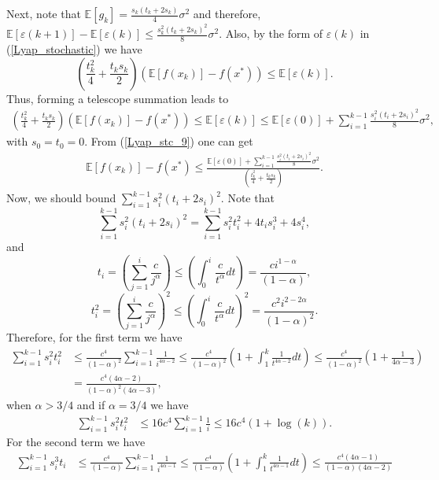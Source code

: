 \documentclass{article}
\theoremstyle{plain}
\theoremstyle{definition}
\theoremstyle{remark}
\begin{document}
        Next, note that $\mathbb E[g_k]= \frac{s_k(t_k+2s_k)}{4}\sigma^2$ and therefore, $\mathbb E [\varepsilon(k+1)]-\mathbb E[ \varepsilon (k)]\leq \frac{s_k^2(t_k+2s_k)^2}{8}\sigma^2$. Also, by the form of $\varepsilon(k)$ in (\ref{Lyap_stochastic}) we have $$(\frac{t_k^2}{4}+\frac{t_{k}s_k}{2})(\mathbb E[f(x_k)]-f(x^*))\leq \mathbb E[\varepsilon(k)].$$
        Thus, forming a telescope summation leads to
        \begin{align}\label{Lyap_stc_9}
            (\frac{t_k^2}{4}+\frac{t_{k}s_k}{2})(\mathbb E[f(x_k)]-f(x^*))\leq\mathbb E[\varepsilon(k)]\leq \mathbb E[\varepsilon(0)] + \sum_{i=1}^{k-1} \frac{s_i^2(t_i+2s_i)^2}{8}\sigma^2,
        \end{align}
        with $s_0=t_0=0$. From (\ref{Lyap_stc_9}) one can get
        \begin{align}\label{Lyap_stc_10}
            \mathbb E[f(x_k)]-f(x^*) \leq \frac{\mathbb E[\varepsilon(0)] + \sum_{i=1}^{k-1} \frac{s_i^2(t_i+2s_i)^2}{8}\sigma^2}{(\frac{t_k^2}{4}+\frac{t_{k}s_k}{2})}.
        \end{align}
        Now, we should bound $\sum_{i=1}^{k-1} s_i^2(t_i+2s_i)^2$. Note that 
        $$\sum_{i=1}^{k-1} s_i^2(t_i+2s_i)^2=\sum_{i=1}^{k-1} s_i^2t_i^2+4t_is_i^3+4s_i^4,$$
        and
        $$t_i=\left(\sum_{j=1}^i\frac{c}{j^{\alpha}}\right)\leq \left(\int_{0}^{i} \frac{c}{t^{\alpha}}dt\right)=\frac{ci^{1-\alpha}}{(1-\alpha)},$$
        $$t_i^2=\left(\sum_{j=1}^i\frac{c}{j^{\alpha}}\right)^2\leq \left(\int_{0}^{i} \frac{c}{t^{\alpha}}dt\right)^2=\frac{c^2i^{2-2\alpha}}{(1-\alpha)^2}.$$
        Therefore, for the first term we have 
        \begin{align}\label{Lyap_stc_11}
            \sum_{i=1}^{k-1} s_i^2t_i^2&\leq \frac{c^4}{(1-\alpha)^2}\sum_{i=1}^{k-1} \frac{1}{i^{4\alpha -2}}\leq \frac{c^4}{(1-\alpha)^2}(1+\int_{1}^{k} \frac{1}{t^{4\alpha -2}}dt)\leq \frac{c^4}{(1-\alpha)^2}(1+\frac{1}{4\alpha-3})\nonumber\\
            &=\frac{c^4(4\alpha -2)}{(1-\alpha)^2(4\alpha-3)},
        \end{align}
        when $\alpha > 3/4$ and if $\alpha=3/4$ we have
        \begin{align}\label{Lyap_stc_12}
            \sum_{i=1}^{k-1} s_i^2t_i^2&\leq 16c^4\sum_{i=1}^{k-1}\frac{1}{i}\leq 16c^4(1+\log (k)).
        \end{align}
        For the second term we have
        \begin{align}\label{Lyap_stc_13}
            \sum_{i=1}^{k-1} s_i^3t_i&\leq \frac{c^4}{(1-\alpha)}\sum_{i=1}^{k-1} \frac{1}{i^{4\alpha -1}}\leq \frac{c^4}{(1-\alpha)}(1+\int_1^k\frac{1}{t^{4\alpha -1}}dt)\leq \frac{c^4(4\alpha -1)}{(1-\alpha)(4\alpha -2)}
         \end{align}
\end{document}
